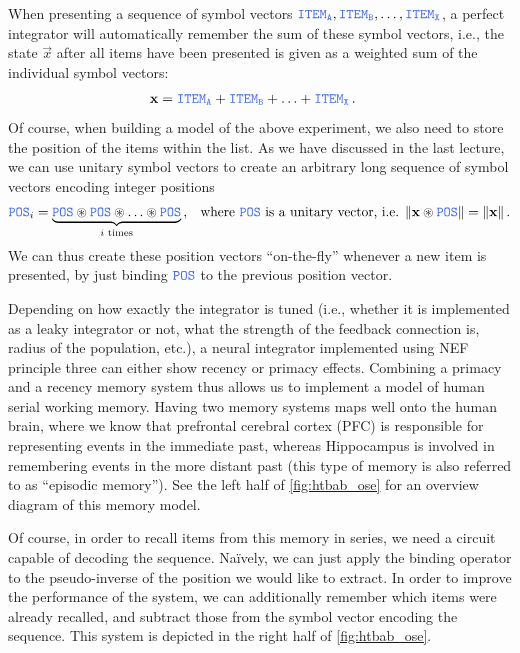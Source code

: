 \documentclass[10pt,letterpaper,oneside]{article}
\newcommand{\Obj}[1]{\ensuremath{\mathtt{\textcolor{RoyalBlue}{#1}}}}
\newcommand{\CC}{\circledast}
\begin{document}
When presenting a sequence of symbol vectors $\Obj{ITEM_A}, \Obj{ITEM_B}, \ldots, \Obj{ITEM_X}$, a perfect integrator will automatically remember the sum of these symbol vectors, i.e., the state $\vec x$ after all items have been presented is given as a weighted sum of the individual symbol vectors:
\begin{align*}
	\vec x &= \Obj{ITEM_A} + \Obj{ITEM_B} + \ldots + \Obj{ITEM_X} \,.
\end{align*}
Of course, when building a model of the above experiment, we also need to store the position of the items within the list. As we have discussed in the last lecture, we can use unitary symbol vectors to create an arbitrary long sequence of symbol vectors encoding integer positions
\begin{align*}
	\Obj{POS}_i &= \underbrace{\Obj{POS} \CC \Obj{POS} \CC \ldots \CC \Obj{POS}}_{i \text{ times}} \,, & \text{where } \Obj{POS} \text { is a unitary vector, i.e. } \| \vec x \CC \Obj{POS} \| = \| \vec x \| \,.
\end{align*}
We can thus create these position vectors \enquote{on-the-fly} whenever a new item is presented, by just binding \Obj{POS} to the previous position vector.

Depending on how exactly the integrator is tuned (i.e., whether it is implemented as a leaky integrator or not, what the strength of the feedback connection is, radius of the population, etc.), a neural integrator implemented using NEF principle three can either show recency or primacy effects. Combining a primacy and a recency memory system thus allows us to implement a model of human serial working memory. Having two memory systems maps well onto the human brain, where we know that prefrontal cerebral cortex (PFC) is responsible for representing events in the immediate past, whereas Hippocampus is involved in remembering events in the more distant past (this type of memory is also referred to as \enquote{episodic memory}). See the left half of \cref{fig:htbab_ose} for an overview diagram of this memory model.

Of course, in order to recall items from this memory in series, we need a circuit capable of decoding the sequence. Na\"ively, we can just apply the binding operator to the pseudo-inverse of the position we would like to extract. In order to improve the performance of the system, we can additionally  remember which items were already recalled, and subtract those from the symbol vector encoding the sequence. This system is depicted in the right half of \cref{fig:htbab_ose}.
\end{document}
